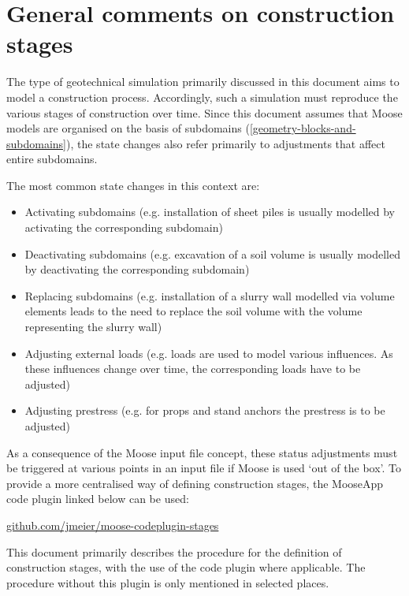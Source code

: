 \section{General comments on construction stages}
\label{chap:stages-general}

The type of geotechnical simulation primarily discussed in this document aims
to model a construction process. Accordingly, such a simulation must reproduce
the various stages of construction over time. Since this document assumes that
Moose models are organised on the basis of subdomains
(\autoref{geometry-blocks-and-subdomains}), the state changes also refer
primarily to adjustments that affect entire subdomains.

The most common state changes in this context are:

\begin{itemize}
      \item Activating subdomains (e.g. installation of sheet piles is usually modelled by
            activating the corresponding subdomain)
      \item Deactivating subdomains (e.g. excavation of a soil volume is usually modelled
            by deactivating the corresponding subdomain)
      \item Replacing subdomains (e.g. installation of a slurry wall modelled via volume
            elements leads to the need to replace the soil volume with the volume
            representing the slurry wall)
      \item Adjusting external loads (e.g. loads are used to model various influences. As
            these influences change over time, the corresponding loads have to be adjusted)
      \item Adjusting prestress (e.g. for props and stand anchors the prestress is to be
            adjusted)
\end{itemize}

As a consequence of the Moose input file concept, these status adjustments must
be triggered at various points in an input file if Moose is used ‘out of the
box’. To provide a more centralised way of defining construction stages, the
\codeword{[Stages]} MooseApp code plugin linked below can be used:

\href{https://github.com/jmeier/moose-codeplugin-stages}{github.com/jmeier/moose-codeplugin-stages}

This document primarily describes the procedure for the definition of
construction stages, with the use of the \codeword{[Stages]} code plugin where
applicable. The procedure without this plugin is only mentioned in selected
places.


